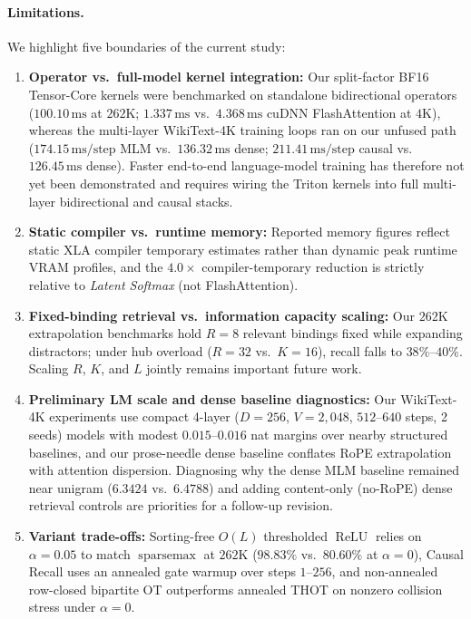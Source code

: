 \documentclass[11pt]{article}
\newcommand{\ReLU}{\operatorname{ReLU}}
\newcommand{\sparsemax}{\operatorname{sparsemax}}
\begin{document}
\paragraph{Limitations.}
We highlight five boundaries of the current study:
\begin{enumerate}[leftmargin=1.5em]
  \item \textbf{Operator vs.\ full-model kernel integration:} Our split-factor BF16 Tensor-Core kernels were benchmarked on standalone bidirectional operators ($100.10\,\text{ms}$ at $262\text{K}$; $1.337\,\text{ms}$ vs.\ $4.368\,\text{ms}$ cuDNN FlashAttention at $4\text{K}$), whereas the multi-layer WikiText-4K training loops ran on our unfused path ($174.15\,\text{ms/step}$ MLM vs.\ $136.32\,\text{ms}$ dense; $211.41\,\text{ms/step}$ causal vs.\ $126.45\,\text{ms}$ dense). Faster end-to-end language-model training has therefore not yet been demonstrated and requires wiring the Triton kernels into full multi-layer bidirectional and causal stacks.
  \item \textbf{Static compiler vs.\ runtime memory:} Reported memory figures reflect static XLA compiler temporary estimates rather than dynamic peak runtime VRAM profiles, and the $4.0\times$ compiler-temporary reduction is strictly relative to \emph{Latent Softmax} (not FlashAttention).
  \item \textbf{Fixed-binding retrieval vs.\ information capacity scaling:} Our $262\text{K}$ extrapolation benchmarks hold $R=8$ relevant bindings fixed while expanding distractors; under hub overload ($R=32$ vs.\ $K=16$), recall falls to $38\%$--$40\%$. Scaling $R$, $K$, and $L$ jointly remains important future work.
  \item \textbf{Preliminary LM scale and dense baseline diagnostics:} Our WikiText-4K experiments use compact 4-layer ($D=256$, $V=2{,}048$, $512$--$640$ steps, 2 seeds) models with modest $0.015$--$0.016$ nat margins over nearby structured baselines, and our prose-needle dense baseline conflates RoPE extrapolation with attention dispersion. Diagnosing why the dense MLM baseline remained near unigram ($6.3424$ vs.\ $6.4788$) and adding content-only (no-RoPE) dense retrieval controls are priorities for a follow-up revision.
  \item \textbf{Variant trade-offs:} Sorting-free $O(L)$ thresholded $\ReLU$ relies on $\alpha=0.05$ to match $\sparsemax$ at $262\text{K}$ ($98.83\%$ vs.\ $80.60\%$ at $\alpha=0$), Causal Recall uses an annealed gate warmup over steps $1$--$256$, and non-annealed row-closed bipartite OT outperforms annealed THOT on nonzero collision stress under $\alpha=0$.
\end{enumerate}
\end{document}
